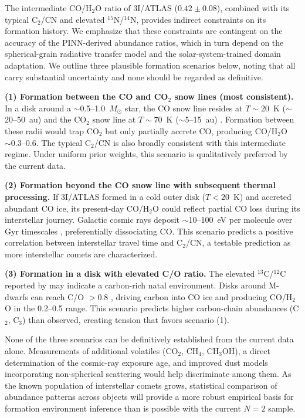 \documentclass[preprint2]{aastex631}
\begin{document}
The intermediate CO/H$_2$O ratio of 3I/ATLAS ($0.42 \pm 0.08$), combined with its typical C$_2$/CN and elevated $^{15}$N/$^{14}$N, provides indirect constraints on its formation history. We emphasize that these constraints are contingent on the accuracy of the PINN-derived abundance ratios, which in turn depend on the spherical-grain radiative transfer model and the solar-system-trained domain adaptation. We outline three plausible formation scenarios below, noting that all carry substantial uncertainty and none should be regarded as definitive.

\textbf{(1) Formation between the CO and CO$_2$ snow lines (most consistent).} In a disk around a $\sim$0.5--1.0~$M_\odot$ star, the CO snow line resides at $T \sim 20$~K ($\sim$20--50~au) and the CO$_2$ snow line at $T \sim 70$~K ($\sim$5--15~au) \citep{qi15}. Formation between these radii would trap CO$_2$ but only partially accrete CO, producing CO/H$_2$O $\sim 0.3$--0.6. The typical C$_2$/CN is also broadly consistent with this intermediate regime. Under uniform prior weights, this scenario is qualitatively preferred by the current data.

\textbf{(2) Formation beyond the CO snow line with subsequent thermal processing.} If 3I/ATLAS formed in a cold outer disk ($T < 20$~K) and accreted abundant CO ice, its present-day CO/H$_2$O could reflect partial CO loss during its interstellar journey. Galactic cosmic rays deposit $\sim$10--100~eV per molecule over Gyr timescales \citep{gerakines01}, preferentially dissociating CO. This scenario predicts a positive correlation between interstellar travel time and C$_2$/CN, a testable prediction as more interstellar comets are characterized.

\textbf{(3) Formation in a disk with elevated C/O ratio.} The elevated $^{13}$C/$^{12}$C reported by \citet{opitom26} may indicate a carbon-rich natal environment. Disks around M-dwarfs can reach C/O $> 0.8$ \citep{bergin14}, driving carbon into CO ice and producing CO/H$_2$O in the 0.2--0.5 range. This scenario predicts higher carbon-chain abundances (C$_2$, C$_3$) than observed, creating tension that favors scenario (1).

None of the three scenarios can be definitively established from the current data alone. Measurements of additional volatiles (CO$_2$, CH$_4$, CH$_3$OH), a direct determination of the cosmic-ray exposure age, and improved dust models incorporating non-spherical scattering would help discriminate among them. As the known population of interstellar comets grows, statistical comparison of abundance patterns across objects will provide a more robust empirical basis for formation environment inference than is possible with the current $N=2$ sample.
\end{document}
